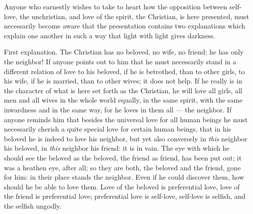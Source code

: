 \documentclass[12pt,a4paper,openany]{book}
\newcommand{\opage}[1]{\marginnote{\footnotesize\textit{[#1]}}}
\begin{document}
Anyone who earnestly wishes to take to heart how
the opposition between self-love, the unchristian,
and love of the spirit, the Christian, is here presented,
must necessarily become aware that the presentation
contains two explanations which explain one another in such a way
that light with light gives darkness.

First explanation. The Christian has no beloved,
no wife, no friend; he has only the neighbor! If anyone
points out to him that he must necessarily
stand in a different relation of love to his beloved, if
he is betrothed, than to other girls, to his wife, if
he is married, than to other wives; it does not help. If
he really is in the character of what is here set forth as
the Christian, he will love all girls, all men and
all wives in the whole world equally, in the same spirit, with
the same inwardness and in the same way, for he loves
in them all --- the neighbor. If anyone reminds him that
besides the universal love for all human beings
he must necessarily cherish a quite special love
for certain human beings, that in his beloved he is indeed to love
his neighbor, but yet also conversely in \emph{this} neighbor his
beloved, in \emph{this} neighbor his friend: it is in vain. The
eye with which he should see the beloved as the beloved,
the friend as friend, has been put out; it was a heathen
eye, after all; so they are both, the beloved and the friend,
gone for him: in their place stands the neighbor.
\setcounter{footnote}{0}%
\opage{509}Even if he could discover them, how should he
be able to love them. Love of the beloved is preferential love,
love of the friend is preferential love; preferential love
is self-love, self-love is selfish, and
the selfish ungodly.
\end{document}
